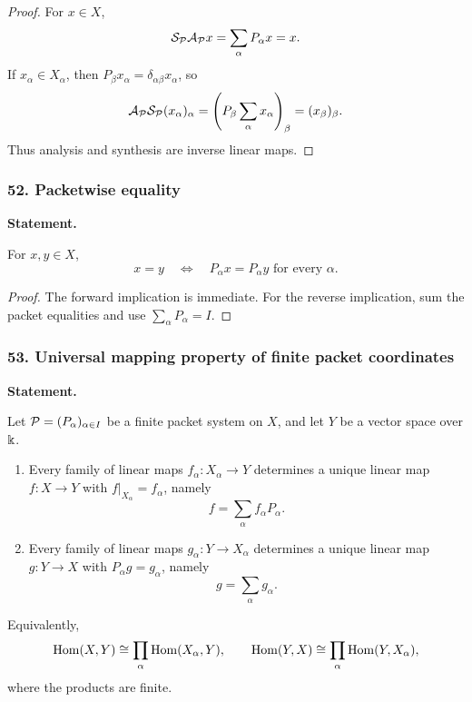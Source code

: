 \begin{proof}
For $x\in X$,
\[
\mathcal S_{\mathcal P}\mathcal A_{\mathcal P}x
=
\sum_\alpha P_\alpha x
=x.
\]
If $x_\alpha\in X_\alpha$, then $P_\beta x_\alpha=\delta_{\alpha\beta}x_\alpha$, so
\[
\mathcal A_{\mathcal P}\mathcal S_{\mathcal P}(x_\alpha)_\alpha
=
\left(P_\beta\sum_\alpha x_\alpha\right)_\beta
=(x_\beta)_\beta.
\]
Thus analysis and synthesis are inverse linear maps.
\end{proof}
\subsubsection*{52. Packetwise equality}
\label{rec:PSC-I-C-PACKETWISE-EQUALITY}
\textbf{Statement.}\par
For $x,y\in X$,
\[
x=y
\quad\Longleftrightarrow\quad
P_\alpha x=P_\alpha y\text{ for every }\alpha.
\]

\begin{proof}
The forward implication is immediate.  For the reverse implication, sum the packet equalities and use $\sum_\alpha P_\alpha=I$.
\end{proof}
\subsubsection*{53. Universal mapping property of finite packet coordinates}
\label{rec:PSC-I-C-PACKET-UNIVERSAL-PROPERTY}
\textbf{Statement.}\par
Let \(\mathcal P=(P_\alpha)_{\alpha\in I}\) be a finite packet system on \(X\), and let \(Y\) be a vector space over \(\Bbbk\).
\begin{enumerate}
\item Every family of linear maps \(f_\alpha:X_\alpha\to Y\) determines a unique linear map \(f:X\to Y\) with \(f|_{X_\alpha}=f_\alpha\), namely
\[
f=\sum_\alpha f_\alpha P_\alpha.
\]
\item Every family of linear maps \(g_\alpha:Y\to X_\alpha\) determines a unique linear map \(g:Y\to X\) with \(P_\alpha g=g_\alpha\), namely
\[
g=\sum_\alpha g_\alpha.
\]
\end{enumerate}
Equivalently,
\[
\operatorname{Hom}(X,Y)\cong\prod_\alpha\operatorname{Hom}(X_\alpha,Y),
\qquad
\operatorname{Hom}(Y,X)\cong\prod_\alpha\operatorname{Hom}(Y,X_\alpha),
\]
where the products are finite.

